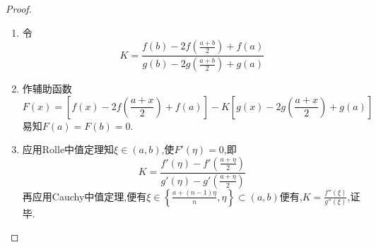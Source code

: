\begin{proof}
	\begin{enumerate}
		\item 令
				$$
					K=\frac{f\left( b \right) -2f\left( \frac{a+b}{2} \right) +f\left( a \right)}{g\left( b \right) -2g\left( \frac{a+b}{2} \right) +g\left( a \right)}
				$$
		\item 作辅助函数
				$$
					F\left( x \right) =\left[ f\left( x \right) -2f\left( \frac{a+x}{2} \right) +f\left( a \right) \right] -K\left[ g\left( x \right) -2g\left( \frac{a+x}{2} \right) +g\left( a \right) \right]
				$$
				易知$F\left( a \right) =F\left( b \right) =0$.
		\item 应用Rolle中值定理知$\xi \in \left( a,b \right) $,使$F'\left( \eta \right) =0$,即
				$$
					K=\frac{f'\left( \eta \right) -f'\left( \frac{a+\eta}{2} \right)}{g'\left( \eta \right) -g'\left( \frac{a+\eta}{2} \right)}
				$$
				再应用Cauchy中值定理,便有$\xi \in \left\{ \frac{ a+\left( n-1 \right) \eta }{n},\eta \right\} \subset \left( a,b \right) $便有,$K=\frac{f''\left( \xi \right)}{g''\left( \xi \right)}$,证毕.
	\end{enumerate}
\end{proof}
